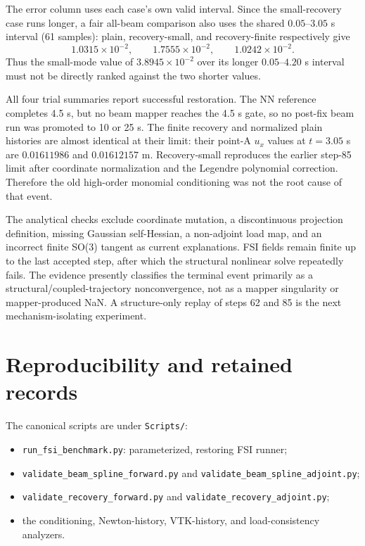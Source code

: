 \documentclass[11pt,a4paper]{article}
\begin{document}
The error column uses each case's own valid interval.  Since the small-recovery
case runs longer, a fair all-beam comparison also uses the shared
\(0.05\)--\(3.05\) s interval (61 samples): plain, recovery-small, and
recovery-finite respectively give
\[
 1.0315\times10^{-2},\qquad
 1.7555\times10^{-2},\qquad
 1.0242\times10^{-2}.
\]
Thus the small-mode value of \(3.8945\times10^{-2}\) over its longer
\(0.05\)--\(4.20\) s interval must not be directly ranked against the two
shorter values.

All four trial summaries report successful restoration.  The NN reference
completes 4.5 s, but no beam mapper reaches the 4.5 s gate, so no post-fix beam
run was promoted to 10 or 25 s.  The finite
recovery and normalized plain histories are almost identical at their limit:
their point-A \(u_x\) values at \(t=3.05\) s are \(0.01611986\) and
\(0.01612157\) m.  Recovery-small reproduces the earlier step-85 limit after
coordinate normalization and the Legendre polynomial correction.  Therefore
the old high-order monomial conditioning was not the root cause of that
event.

The analytical checks exclude coordinate mutation, a discontinuous projection
definition, missing Gaussian self-Hessian, a non-adjoint load map, and an
incorrect finite SO(3) tangent as current explanations.  FSI fields remain
finite up to the last accepted step, after which the structural nonlinear
solve repeatedly fails.  The evidence presently classifies the terminal event
primarily as a structural/coupled-trajectory nonconvergence, not as a mapper
singularity or mapper-produced NaN.  A structure-only replay of steps 62 and
85 is the next mechanism-isolating experiment.

\section{Reproducibility and retained records}

The canonical scripts are under \texttt{Scripts/}:
\begin{itemize}
\item \texttt{run\_fsi\_benchmark.py}: parameterized, restoring FSI runner;
\item \texttt{validate\_beam\_spline\_forward.py} and
      \texttt{validate\_beam\_spline\_adjoint.py};
\item \texttt{validate\_recovery\_forward.py} and
      \texttt{validate\_recovery\_adjoint.py};
\item the conditioning, Newton-history, VTK-history, and load-consistency
      analyzers.
\end{itemize}
\end{document}
